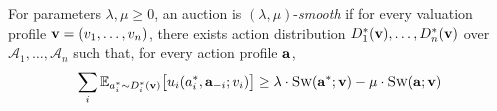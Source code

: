 \begin{definition}	\label{def:smooth-auctions}
For parameters $\lambda, \mu \geq 0$, an auction is $(\lambda,\mu)$-\emph{smooth} if for every valuation profile 
$\mathbf{v} = (v_{1}, \ldots, v_{n})$,
there exists action distribution $D^{*}_{1}(\mathbf{v}), \ldots,D^{*}_{n}(\mathbf{v})$ over $\mathcal{A}_{1}, \ldots, \mathcal{A}_{n}$
such that, for every action profile $\mathbf{a}$,
%
\begin{align}	\label{eq:smooth-auctions}
\sum_{i} \mathbb{E}_{a^{*}_{i} \sim D^{*}_{i}(\mathbf{v})} \bigl[ u_{i}(a^{*}_{i},\mathbf{a}_{-i}; v_{i}) \bigr]
	\geq \lambda \cdot \textsc{Sw}(\mathbf{a}^{*};\mathbf{v}) - \mu \cdot \textsc{Sw}(\mathbf{a};\mathbf{v})  
\end{align}
\end{definition}
